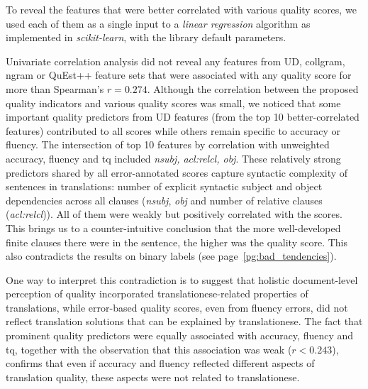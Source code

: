 To reveal the features that were better correlated with various quality scores, we used each of them as a single input to a \textit{linear regression} algorithm as implemented in \textit{scikit-learn}, with the library default parameters.  %

Univariate correlation analysis did not reveal any features from UD, collgram, ngram or QuEst++ feature sets that were associated with any quality score for more than Spearman's $r=0.274$. %
\label{pg:scores_not_translationese}
Although the correlation between the proposed quality indicators and various quality scores was small, we noticed that some important quality predictors from UD features (from the top 10 better-correlated features) contributed to all scores while others remain specific to accuracy or fluency. The intersection of top 10 features by correlation with unweighted accuracy, fluency and tq included \textit{nsubj, acl:relcl, obj}. These relatively strong predictors shared by all error-annotated scores capture syntactic complexity of sentences in translations: number of explicit syntactic subject and object dependencies across all clauses (\textit{nsubj}, \textit{obj} and number of relative clauses (\textit{acl:relcl})). All of them were weakly but positively correlated with the scores. This brings us to a counter-intuitive conclusion that the more well-developed finite clauses there were in the sentence, the higher was the quality score. This also contradicts the results on binary labels (see page~\ref{pg:bad_tendencies}).

One way to interpret this contradiction is to suggest that holistic document-level perception of quality incorporated translationese-related properties of translations, while error-based quality scores, even from fluency errors, did not reflect translation solutions that can be explained by translationese. 
The fact that prominent quality predictors were equally associated with accuracy, fluency and tq, together with the observation that this association was weak ($r<0.243$), confirms that even if accuracy and fluency reflected different aspects of translation quality, these aspects were not related to translationese.

